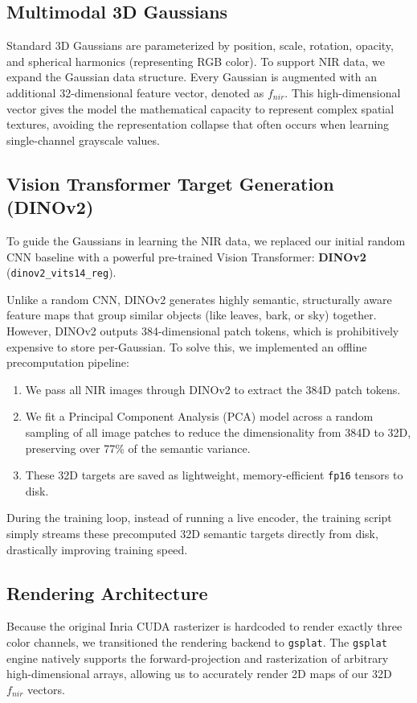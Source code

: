 \documentclass[12pt]{article}
\begin{document}
\subsection{Multimodal 3D Gaussians}
Standard 3D Gaussians are parameterized by position, scale, rotation, opacity, and spherical harmonics (representing RGB color). To support NIR data, we expand the Gaussian data structure. Every Gaussian is augmented with an additional 32-dimensional feature vector, denoted as $f_{nir}$. This high-dimensional vector gives the model the mathematical capacity to represent complex spatial textures, avoiding the representation collapse that often occurs when learning single-channel grayscale values.

\subsection{Vision Transformer Target Generation (DINOv2)}
To guide the Gaussians in learning the NIR data, we replaced our initial random CNN baseline with a powerful pre-trained Vision Transformer: \textbf{DINOv2} (\texttt{dinov2\_vits14\_reg}). 

Unlike a random CNN, DINOv2 generates highly semantic, structurally aware feature maps that group similar objects (like leaves, bark, or sky) together. However, DINOv2 outputs 384-dimensional patch tokens, which is prohibitively expensive to store per-Gaussian.
To solve this, we implemented an offline precomputation pipeline:
\begin{enumerate}
    \item We pass all NIR images through DINOv2 to extract the 384D patch tokens.
    \item We fit a Principal Component Analysis (PCA) model across a random sampling of all image patches to reduce the dimensionality from 384D to 32D, preserving over 77\% of the semantic variance.
    \item These 32D targets are saved as lightweight, memory-efficient \texttt{fp16} tensors to disk.
\end{enumerate}

During the training loop, instead of running a live encoder, the training script simply streams these precomputed 32D semantic targets directly from disk, drastically improving training speed.

\subsection{Rendering Architecture}
Because the original Inria CUDA rasterizer is hardcoded to render exactly three color channels, we transitioned the rendering backend to \texttt{gsplat}. The \texttt{gsplat} engine natively supports the forward-projection and rasterization of arbitrary high-dimensional arrays, allowing us to accurately render 2D maps of our 32D $f_{nir}$ vectors.
\end{document}
